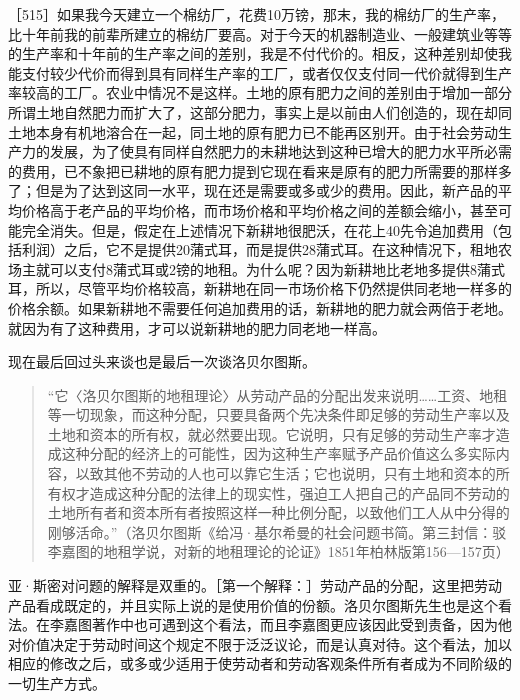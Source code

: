 ［515］如果我今天建立一个棉纺厂，花费10万镑，那末，我的棉纺厂的生产率，比十年前我的前辈所建立的棉纺厂要高。对于今天的机器制造业、一般建筑业等等的生产率和十年前的生产率之间的差别，我是不付代价的。相反，这种差别却使我能支付较少代价而得到具有同样生产率的工厂，或者仅仅支付同一代价就得到生产率较高的工厂。农业中情况不是这样。土地的原有肥力之间的差别由于增加一部分所谓土地自然肥力而扩大了，这部分肥力，事实上是以前由人们创造的，现在却同土地本身有机地溶合在一起，同土地的原有肥力已不能再区别开。由于社会劳动生产力的发展，为了使具有同样自然肥力的未耕地达到这种已增大的肥力水平所必需的费用，已不象把已耕地的原有肥力提到它现在看来是原有的肥力所需要的那样多了；但是为了达到这同一水平，现在还是需要或多或少的费用。因此，新产品的平均价格高于老产品的平均价格，而市场价格和平均价格之间的差额会缩小，甚至可能完全消失。但是，假定在上述情况下新耕地很肥沃，在花上40先令追加费用（包括利润）之后，它不是提供20蒲式耳，而是提供28蒲式耳。在这种情况下，租地农场主就可以支付8蒲式耳或2镑的地租。为什么呢？因为新耕地比老地多提供8蒲式耳，所以，尽管平均价格较高，新耕地在同一市场价格下仍然提供同老地一样多的价格余额。如果新耕地不需要任何追加费用的话，新耕地的肥力就会两倍于老地。就因为有了这种费用，才可以说新耕地的肥力同老地一样高。


现在最后回过头来谈也是最后一次谈洛贝尔图斯。

\begin{quote}{“它〈洛贝尔图斯的地租理论〉从劳动产品的分配出发来说明……工资、地租等一切现象，而这种分配，只要具备两个先决条件即足够的劳动生产率以及土地和资本的所有权，就必然要出现。它说明，只有足够的劳动生产率才造成这种分配的经济上的可能性，因为这种生产率赋予产品价值这么多实际内容，以致其他不劳动的人也可以靠它生活；它也说明，只有土地和资本的所有权才造成这种分配的法律上的现实性，强迫工人把自己的产品同不劳动的土地所有者和资本所有者按照这样一种比例分配，以致他们工人从中分得的刚够活命。”（洛贝尔图斯《给冯·基尔希曼的社会问题书简。第三封信：驳李嘉图的地租学说，对新的地租理论的论证》1851年柏林版第156—157页）}\end{quote}

亚·斯密对问题的解释是双重的。［第一个解释：］劳动产品的分配，这里把劳动产品看成既定的，并且实际上说的是使用价值的份额。洛贝尔图斯先生也是这个看法。在李嘉图著作中也可遇到这个看法，而且李嘉图更应该因此受到责备，因为他对价值决定于劳动时间这个规定不限于泛泛议论，而是认真对待。这个看法，加以相应的修改之后，或多或少适用于使劳动者和劳动客观条件所有者成为不同阶级的一切生产方式。

